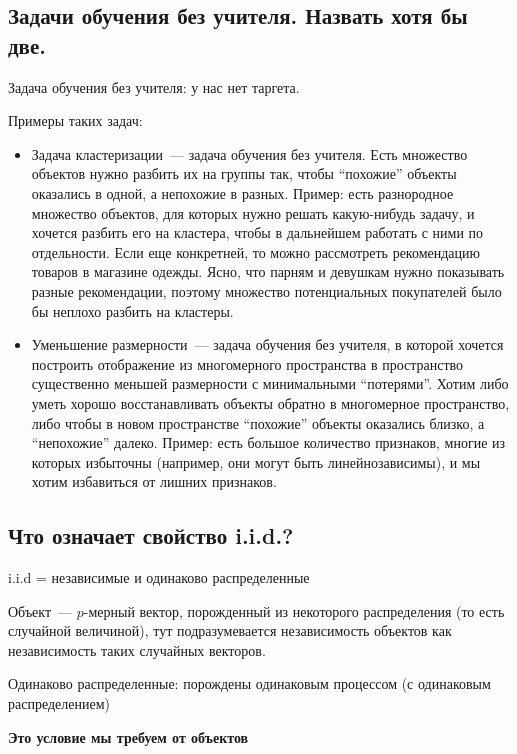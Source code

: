 \subsection{Задачи обучения без учителя. Назвать хотя бы две.}

\Note Задача обучения без учителя: у нас нет таргета. 

Примеры таких задач:

\begin{itemize}
    \item Задача кластеризации~--- задача обучения без учителя. Есть множество объектов нужно разбить их на группы так, чтобы “похожие” объекты оказались в одной, а непохожие в разных. Пример: есть разнородное множество объектов, для которых нужно решать какую-нибудь задачу, и хочется разбить его на кластера, чтобы в дальнейшем работать с ними по отдельности. Если еще конкретней, то можно рассмотреть рекомендацию товаров в магазине одежды. Ясно, что парням и девушкам нужно показывать разные рекомендации, поэтому множество потенциальных покупателей было бы неплохо разбить на кластеры.
    
    \item Уменьшение размерности~--- задача обучения без учителя, в которой хочется построить отображение из многомерного пространства в пространство существенно меньшей размерности с минимальными “потерями”. Хотим либо уметь хорошо восстанавливать объекты обратно в многомерное пространство, либо чтобы в новом пространстве “похожие” объекты оказались близко, а “непохожие” далеко. Пример: есть большое количество признаков, многие из которых избыточны (например, они могут быть линейнозависимы), и мы хотим избавиться от лишних признаков.
\end{itemize}




\subsection{Что означает свойство i.i.d.?}

\Def i.i.d = независимые и одинаково распределенные

\Note Объект~--- $p$-мерный вектор, порожденный из некоторого распределения (то есть случайной величиной), тут подразумевается независимость объектов как независимость таких случайных векторов.

\Note Одинаково распределенные: порождены одинаковым процессом (с одинаковым распределением)

\textbf{Это условие мы требуем от объектов}





